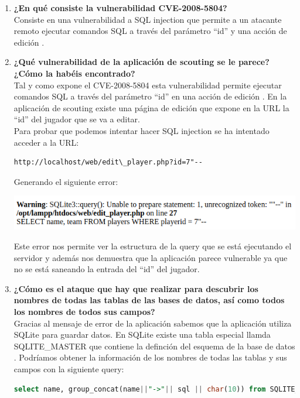 \documentclass[10pt,a4paper]{article}
\begin{document}
\begin{enumerate}
\item \textbf{¿En qué consiste la vulnerabilidad CVE-2008-5804?}\\
Consiste en una vulnerabilidad a SQL injection que permite a un atacante remoto ejecutar comandos SQL a través del parámetro ``id'' y una acción de edición \cite{cve}.
\item \textbf{¿Qué vulnerabilidad de la aplicación de scouting se le parece? ¿Cómo la habéis
encontrado?}\\
Tal y como expone el CVE-2008-5804 esta vulnerabilidad  permite ejecutar comandos SQL a través del parámetro ``id'' en una acción de edición \cite{cve}. En la aplicación de scouting existe una página de edición que expone en la URL la ``id'' del jugador que se va a editar.\\
Para probar que podemos intentar hacer SQL injection se ha intentado acceder a la URL:
\begin{lstlisting}
http://localhost/web/edit\_player.php?id=7"--
\end{lstlisting}
Generando el siguiente error:
\begin{center}
\includegraphics[scale=0.5]{sqli1.png}
\end{center}
Este error nos permite ver la estructura de la query que se está ejecutando el servidor y además nos demuestra que la aplicación parece vulnerable ya que no se está saneando la entrada del ``id'' del jugador.

\item \textbf{¿Cómo es el ataque que hay que realizar para descubrir los nombres de todas las
tablas de las bases de datos, así como todos los nombres de todos sus campos?}\\
Gracias al mensaje de error de la aplicación sabemos que la aplicación utiliza SQLite para guardar datos. En SQLite existe una tabla especial llamda SQLITE\_MASTER que contiene la definción del esquema de la base de datos \cite{sqlite}. Podríamos obtener la información de los nombres de todas las tablas y sus campos con la siguiente query:
\begin{lstlisting}[language=SQL,caption={Obtener todos los nombres y la definición de las tablas}]
select name, group_concat(name||"->"|| sql || char(10)) from SQLITE_MASTER;
\end{lstlisting}


\end{enumerate}
\end{document}
